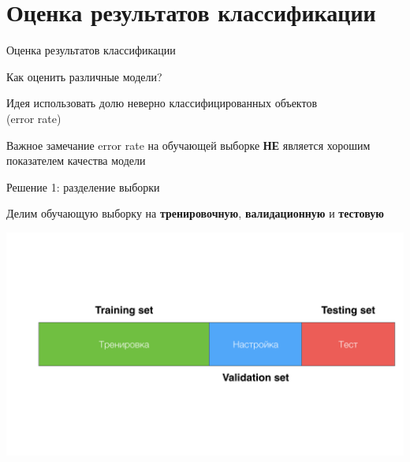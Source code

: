 \documentclass[10pt]{beamer}
\begin{document}
\section{Оценка результатов классификации}

\begin{frame}{}

\begin{center}
\Large Оценка результатов классификации
\end{center}

\end{frame}

\begin{frame}{Как оценить различные модели?}

\begin{block}{Идея}
использовать долю неверно классифицированных объектов \\ (error rate)
\end{block}

\begin{alertblock}{Важное замечание}
error rate на обучающей выборке {\bf НЕ} является хорошим показателем качества модели
\end{alertblock}

\end{frame}

\begin{frame}{Решение 1: разделение выборки}

Делим обучающую выборку на {\bf тренировочную}, {\bf валидационную} и {\bf тестовую}

\begin{center}
\includegraphics[scale=0.15]{images/vtt.png}
\end{center}
  
\end{frame}
\end{document}
